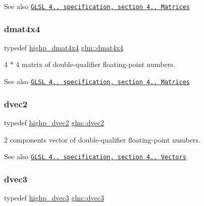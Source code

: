 \begin{DoxySeeAlso}{See also}
\href{http://www.opengl.org/registry/doc/GLSLangSpec.4.20.8.pdf}{\tt G\+L\+SL 4.. specification, section 4.. Matrices} 
\end{DoxySeeAlso}
\mbox{\label{group__core__types_ga54d90d4b902d93638b906571af215bb1}} 
\subsubsection{\texorpdfstring{dmat4x4}{dmat4x4}}
{\footnotesize\ttfamily typedef \mbox{\hyperlink{group__core__precision_gad3df38df8c4f7ef9b38f03581ff60142}{highp\+\_\+dmat4x4}} \mbox{\hyperlink{group__core__types_ga54d90d4b902d93638b906571af215bb1}{glm\+::dmat4x4}}}

4 $\ast$ 4 matrix of double-\/qualifier floating-\/point numbers.

\begin{DoxySeeAlso}{See also}
\href{http://www.opengl.org/registry/doc/GLSLangSpec.4.20.8.pdf}{\tt G\+L\+SL 4.. specification, section 4.. Matrices} 
\end{DoxySeeAlso}
\mbox{\label{group__core__types_gae6727259898288cae197724d5f172b3b}} 
\subsubsection{\texorpdfstring{dvec2}{dvec2}}
{\footnotesize\ttfamily typedef \mbox{\hyperlink{group__core__precision_gadec51e8e57b72d8fc95e87f18d1ad4dd}{highp\+\_\+dvec2}} \mbox{\hyperlink{group__core__types_gae6727259898288cae197724d5f172b3b}{glm\+::dvec2}}}

2 components vector of double-\/qualifier floating-\/point numbers.

\begin{DoxySeeAlso}{See also}
\href{http://www.opengl.org/registry/doc/GLSLangSpec.4.20.8.pdf}{\tt G\+L\+SL 4.. specification, section 4.. Vectors} 
\end{DoxySeeAlso}
\mbox{\label{group__core__types_ga7f3287f952e6ccb481231368091702ac}} 
\subsubsection{\texorpdfstring{dvec3}{dvec3}}
{\footnotesize\ttfamily typedef \mbox{\hyperlink{group__core__precision_ga63f89fa26f599ac15428c9d1a70a5467}{highp\+\_\+dvec3}} \mbox{\hyperlink{group__core__types_ga7f3287f952e6ccb481231368091702ac}{glm\+::dvec3}}}

